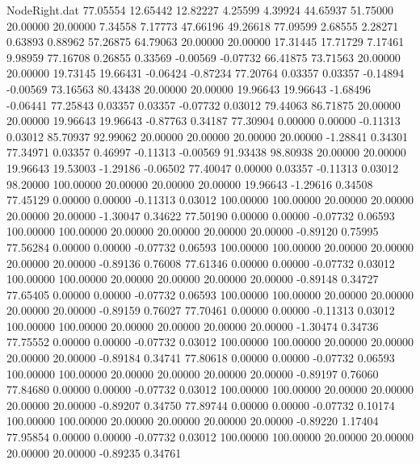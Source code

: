 \begin{filecontents}{NodeRight.dat}
  77.05554   12.65442   12.82227     4.25599    4.39924   44.65937   51.75000   20.00000   20.00000    7.34558    7.17773   47.66196   49.26618
  77.09599    2.68555    2.28271     0.63893    0.88962   57.26875   64.79063   20.00000   20.00000   17.31445   17.71729    7.17461    9.98959
  77.16708    0.26855    0.33569    -0.00569   -0.07732   66.41875   73.71563   20.00000   20.00000   19.73145   19.66431   -0.06424   -0.87234
  77.20764    0.03357    0.03357    -0.14894   -0.00569   73.16563   80.43438   20.00000   20.00000   19.96643   19.96643   -1.68496   -0.06441
  77.25843    0.03357    0.03357    -0.07732    0.03012   79.44063   86.71875   20.00000   20.00000   19.96643   19.96643   -0.87763    0.34187
  77.30904    0.00000    0.00000    -0.11313    0.03012   85.70937   92.99062   20.00000   20.00000   20.00000   20.00000   -1.28841    0.34301
  77.34971    0.03357    0.46997    -0.11313   -0.00569   91.93438   98.80938   20.00000   20.00000   19.96643   19.53003   -1.29186   -0.06502
  77.40047    0.00000    0.03357    -0.11313    0.03012   98.20000  100.00000   20.00000   20.00000   20.00000   19.96643   -1.29616    0.34508
  77.45129    0.00000    0.00000    -0.11313    0.03012  100.00000  100.00000   20.00000   20.00000   20.00000   20.00000   -1.30047    0.34622
  77.50190    0.00000    0.00000    -0.07732    0.06593  100.00000  100.00000   20.00000   20.00000   20.00000   20.00000   -0.89120    0.75995
  77.56284    0.00000    0.00000    -0.07732    0.06593  100.00000  100.00000   20.00000   20.00000   20.00000   20.00000   -0.89136    0.76008
  77.61346    0.00000    0.00000    -0.07732    0.03012  100.00000  100.00000   20.00000   20.00000   20.00000   20.00000   -0.89148    0.34727
  77.65405    0.00000    0.00000    -0.07732    0.06593  100.00000  100.00000   20.00000   20.00000   20.00000   20.00000   -0.89159    0.76027
  77.70461    0.00000    0.00000    -0.11313    0.03012  100.00000  100.00000   20.00000   20.00000   20.00000   20.00000   -1.30474    0.34736
  77.75552    0.00000    0.00000    -0.07732    0.03012  100.00000  100.00000   20.00000   20.00000   20.00000   20.00000   -0.89184    0.34741
  77.80618    0.00000    0.00000    -0.07732    0.06593  100.00000  100.00000   20.00000   20.00000   20.00000   20.00000   -0.89197    0.76060
  77.84680    0.00000    0.00000    -0.07732    0.03012  100.00000  100.00000   20.00000   20.00000   20.00000   20.00000   -0.89207    0.34750
  77.89744    0.00000    0.00000    -0.07732    0.10174  100.00000  100.00000   20.00000   20.00000   20.00000   20.00000   -0.89220    1.17404
  77.95854    0.00000    0.00000    -0.07732    0.03012  100.00000  100.00000   20.00000   20.00000   20.00000   20.00000   -0.89235    0.34761

\end{filecontents}
